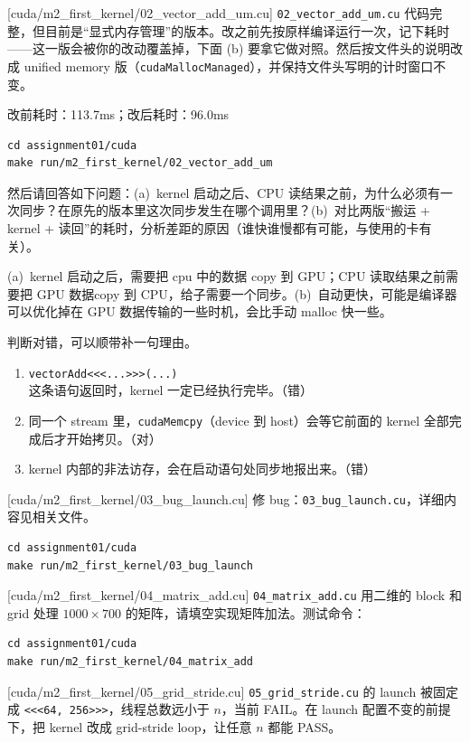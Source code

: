 \documentclass[11pt,a4paper,fontset=none]{ctexart}
\begin{document}
[cuda/m2\_first\_kernel/02\_vector\_add\_um.cu]
\texttt{02\_vector\_add\_um.cu} 代码完整，但目前是“显式内存管理”的版本。改之前先按原样编译运行一次，记下耗时——这一版会被你的改动覆盖掉，下面 (b) 要拿它做对照。然后按文件头的说明改成 unified memory 版（\texttt{cudaMallocManaged}），并保持文件头写明的计时窗口不变。

改前耗时：113.7ms；改后耗时：96.0ms

\begin{lstlisting}
cd assignment01/cuda
make run/m2_first_kernel/02_vector_add_um
\end{lstlisting}

然后请回答如下问题：(a)~kernel 启动之后、CPU 读结果之前，为什么必须有一次同步？在原先的版本里这次同步发生在哪个调用里？(b)~对比两版“搬运 + kernel + 读回”的耗时，分析差距的原因（谁快谁慢都有可能，与使用的卡有关）。

(a)~kernel 启动之后，需要把 cpu 中的数据 copy 到 GPU；CPU 读取结果之前需要把 GPU 数据copy 到 CPU，给子需要一个同步。(b)~自动更快，可能是编译器可以优化掉在 GPU 数据传输的一些时机，会比手动 malloc 快一些。

判断对错，可以顺带补一句理由。
\begin{enumerate}[label=(\alph*)]
  \item \texttt{vectorAdd<<<...>>>(...)} 这条语句返回时，kernel 一定已经执行完毕。（错）
  \item 同一个 stream 里，\texttt{cudaMemcpy}（device 到 host）会等它前面的 kernel 全部完成后才开始拷贝。（对）
  \item kernel 内部的非法访存，会在启动语句处同步地报出来。（错）
\end{enumerate}

[cuda/m2\_first\_kernel/03\_bug\_launch.cu]
修 bug：\texttt{03\_bug\_launch.cu}，详细内容见相关文件。

\begin{lstlisting}
cd assignment01/cuda
make run/m2_first_kernel/03_bug_launch
\end{lstlisting}

[cuda/m2\_first\_kernel/04\_matrix\_add.cu]
\texttt{04\_matrix\_add.cu} 用二维的 block 和 grid 处理 $1000 \times 700$ 的矩阵，请填空实现矩阵加法。测试命令：

\begin{lstlisting}
cd assignment01/cuda
make run/m2_first_kernel/04_matrix_add
\end{lstlisting}

[cuda/m2\_first\_kernel/05\_grid\_stride.cu]
\texttt{05\_grid\_stride.cu} 的 launch 被固定成 \texttt{<<<64, 256>>>}，线程总数远小于 $n$，当前 FAIL。在 launch 配置不变的前提下，把 kernel 改成 grid-stride loop，让任意 $n$ 都能 PASS。
\end{document}
